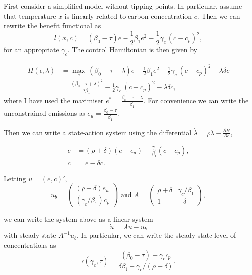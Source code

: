 \documentclass[../../main.tex]{subfiles}
\begin{document}
First consider a simplified model without tipping points. In particular, assume that temperature $x$ is linearly related to carbon concentration $c$. Then we can rewrite the benefit functional as \begin{equation}
    l(x, c) = (\beta_0 - \tau) e - \frac{1}{2}\beta_1 e^2 - \frac{1}{2} \gamma_c \ (c - c_p)^2,
\end{equation} for an appropriate $\gamma_c$. The control Hamiltonian is then given by

\begin{equation}
    \begin{split}
        H(c, \lambda) &= \max_e \ (\beta_0 - \tau + \lambda) e - \frac{1}{2} \beta_1 e^2 - \frac{1}{2} \gamma_c \ (c - c_p)^2 - \lambda \delta c \\
        &= \frac{(\beta_0 - \tau + \lambda)^2}{2\beta_1} - \frac{1}{2} \gamma_c \ (c - c_p)^2 - \lambda \delta c,
    \end{split}
\end{equation} where I have used the maximiser $e^* = \frac{\beta_0 - \tau + \lambda}{\beta_1}$. For convenience we can write the unconstrained emissions as $e_u = \frac{\beta_0 - \tau}{\beta_1}$.

Then we can write a state-action system using the differential $\dot{\lambda} = \rho \lambda - \frac{\partial H}{\partial c}$,

\begin{align}
    \dot{e} &= (\rho + \delta) (e - e_u) + \frac{\gamma_c}{\beta_1} (c - c_p), \label{eq:linear-e-dot} \\
    \dot{c} &= e - \delta c. \label{eq:linear-c-dot}
\end{align}

Letting $u = (e, c)'$, \begin{equation}
    u_b = \begin{pmatrix}(\rho + \delta) e_u \\ (\gamma_c / \beta_1) c_p \end{pmatrix} \text{ and }
    A = \begin{pmatrix}
        \rho + \delta & \gamma_c / \beta_1 \\
        1 & -\delta 
    \end{pmatrix},
\end{equation}

we can write the system above as a linear system \begin{equation}
    \dot{u} = A u - u_b
\end{equation} with steady state $A^{-1} u_b$. In particular, we can write the steady state level of concentrations as \begin{equation}
    \bar{c}(\gamma_c, \tau) = \frac{(\beta_0 - \tau) - \gamma_c c_p}{\delta \beta_1 + \gamma_c / (\rho + \delta)}.
\end{equation}
\end{document}
